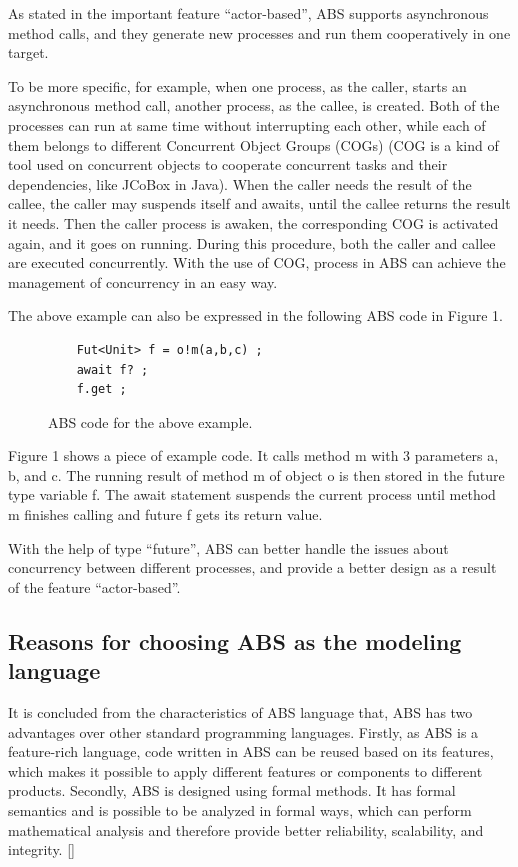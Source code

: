 \documentclass[article,dr=phil,type=drfinal,colorback,accentcolor=tud9c]{tudthesis}
\begin{document}
  As stated in the important feature ``actor-based'', ABS supports asynchronous method calls, and they generate new processes and run them cooperatively in one target. 
  
  To be more specific, for example, when one process, as the caller, starts an asynchronous method call, another process, as the callee, is created. Both of the processes can run at same time without interrupting each other, while each of them belongs to different Concurrent Object Groups (COGs) (COG is a kind of tool used on concurrent objects to cooperate concurrent tasks and their dependencies, like JCoBox in Java). When the caller needs the result of the callee, the caller may suspends itself and awaits, until the callee returns the result it needs. Then the caller process is awaken, the corresponding COG is activated again, and it goes on running. During this procedure, both the caller and callee are executed concurrently. With the use of COG, process in ABS can achieve the management of concurrency in an easy way.
  
  The above example can also be expressed in the following ABS code in Figure 1.
  
  \begin{figure}[H]
  	\begin{lstlisting}
  	Fut<Unit> f = o!m(a,b,c) ;
  	await f? ;
  	f.get ;\end{lstlisting}
  	\caption[Caption for LOF]{ABS code for the above example.}
  \end{figure}  
  
  Figure 1 shows a piece of example code. It calls method m with 3 parameters a, b, and c. The running result of method m of object o is then stored in the future type variable f. The await statement suspends the current process until method m finishes calling and future f gets its return value.
  
  With the help of type ``future'', ABS can better handle the issues about concurrency between different processes, and provide a better design as a result of the feature ``actor-based''.
    
  \subsection{Reasons for choosing ABS as the modeling language}
  
  It is concluded from the characteristics of ABS language that, ABS has two advantages over other standard programming languages. Firstly, as ABS is a feature-rich language, code written in ABS can be reused based on its features, which makes it possible to apply different features or components to different products. Secondly, ABS is designed using formal methods. It has formal semantics and is possible to be analyzed in formal ways, which can perform mathematical analysis and therefore provide better reliability, scalability, and integrity. []
  
\end{document}
